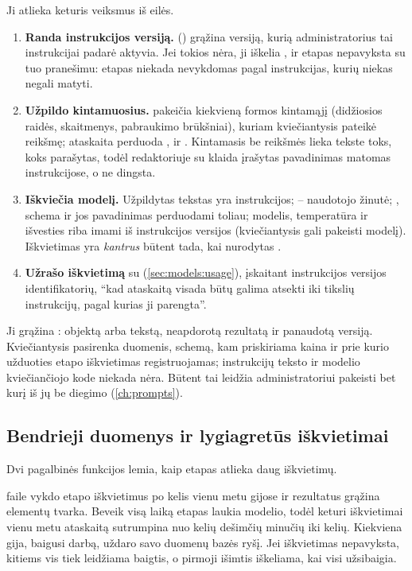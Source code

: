 Ji atlieka keturis veiksmus iš eilės.

\begin{enumerate}
  \item \textbf{Randa instrukcijos versiją.} 
    () grąžina versiją, kurią administratorius tai instrukcijai padarė
    aktyvia. Jei tokios nėra, ji iškelia , ir etapas nepavyksta su
    tuo pranešimu: etapas niekada nevykdomas pagal instrukcijas, kurių niekas negali matyti.
  \item \textbf{Užpildo kintamuosius.}  pakeičia kiekvieną  formos
    kintamąjį (didžiosios raidės, skaitmenys, pabraukimo brūkšniai), kuriam kviečiantysis
    pateikė reikšmę; ataskaita perduoda ,  ir
    . Kintamasis be reikšmės lieka tekste toks, koks parašytas, todėl
    redaktoriuje su klaida įrašytas pavadinimas matomas instrukcijose, o ne dingsta.
  \item \textbf{Iškviečia modelį.} Užpildytas tekstas yra instrukcijos;  -- naudotojo
    žinutė; , schema ir jos pavadinimas perduodami toliau; modelis, temperatūra ir
    išvesties riba imami iš instrukcijos versijos (kviečiantysis gali pakeisti modelį).
    Iškvietimas yra \emph{kantrus} būtent tada, kai nurodytas .
  \item \textbf{Užrašo iškvietimą} su  (\cref{sec:models:usage}), įskaitant
    instrukcijos versijos identifikatorių, \enquote{kad ataskaitą visada būtų galima atsekti iki
    tikslių instrukcijų, pagal kurias ji parengta}.
\end{enumerate}

Ji grąžina : objektą arba tekstą, neapdorotą rezultatą ir panaudotą versiją.
Kviečiantysis pasirenka duomenis, schemą, kam priskiriama kaina ir prie kurio užduoties etapo
iškvietimas registruojamas; instrukcijų teksto ir modelio kviečiančiojo kode niekada nėra. Būtent
tai leidžia administratoriui pakeisti bet kurį iš jų be diegimo (\cref{ch:prompts}).

\subsection{Bendrieji duomenys ir lygiagretūs iškvietimai}

Dvi pagalbinės funkcijos lemia, kaip etapas atlieka daug iškvietimų.

 faile  vykdo etapo
iškvietimus po kelis vienu metu gijose ir rezultatus grąžina elementų tvarka. Beveik visą laiką
etapas laukia modelio, todėl keturi iškvietimai vienu metu ataskaitą sutrumpina nuo kelių
dešimčių minučių iki kelių. Kiekviena gija, baigusi darbą, uždaro savo duomenų bazės ryšį. Jei
iškvietimas nepavyksta, kitiems vis tiek leidžiama baigtis, o pirmoji išimtis iškeliama, kai
visi užsibaigia.

